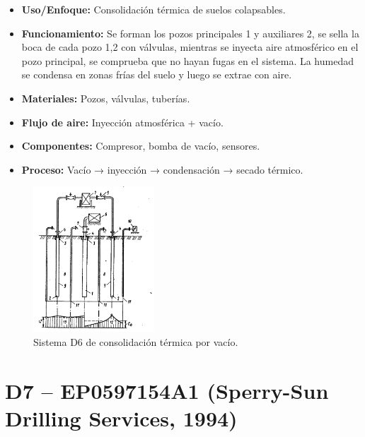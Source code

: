 \documentclass[12pt]{article}
\begin{document}
\begin{itemize}
    \item \textbf{Uso/Enfoque:} Consolidación térmica de suelos colapsables.
    \item \textbf{Funcionamiento:} Se forman los pozos principales 1 y auxiliares 2, se sella la boca de cada pozo 1,2 con válvulas, mientras se inyecta aire atmosférico en el pozo principal, se comprueba que no hayan fugas en el sistema. La humedad se condensa en zonas frías del suelo y luego se extrae con aire.
    \item \textbf{Materiales:} Pozos, válvulas, tuberías.
    \item \textbf{Flujo de aire:} Inyección atmosférica + vacío.
    \item \textbf{Componentes:} Compresor, bomba de vacío, sensores.
    \item \textbf{Proceso:} Vacío → inyección → condensación → secado térmico.
\end{itemize}

\begin{figure}[H]
\centering
\includegraphics[width=0.4\textwidth]{images/d6_urss.png}
\caption{Sistema D6 de consolidación térmica por vacío.}
\end{figure}

\section*{D7 – EP0597154A1 (Sperry-Sun Drilling Services, 1994)}
\end{document}
